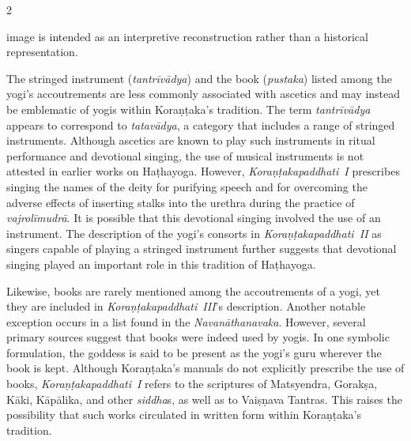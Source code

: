 \begin{nohyp}
\begin{multicols*}{2}
\begin{eng}
\noindent
image is intended as an interpretive reconstruction rather than a historical representation.

The stringed instrument (\emph{tantrīvādya}) and the book (\emph{pustaka}) listed among the yogi's accoutrements are less commonly associated with ascetics and may instead be emblematic of yogis within Koraṇṭaka's tradition. The term \emph{tantrīvādya} appears to correspond to \emph{tatavādya}, a category that includes a range of stringed instruments. Although ascetics are known to play such instruments in ritual performance and devotional singing, the use of musical instruments is not attested in earlier works on Haṭhayoga. However, \emph{Koraṇṭakapaddhati}~\emph{I} prescribes singing the names of the deity for purifying speech and for overcoming the adverse effects of inserting stalks into the urethra during the practice of \emph{vajrolīmudrā}. It is possible that this devotional singing involved the use of an instrument. The description of the yogi's consorts in \emph{Koraṇṭakapaddhati~II} as singers capable of playing a stringed instrument further suggests that devotional singing played an important role in this tradition of Haṭhayoga.

Likewise, books are rarely mentioned among the accoutrements of a yogi, yet they are included in \emph{Koraṇṭakapaddhati~III}'s description. Another notable exception occurs in a list found in the \emph{Navanāthanavaka}. However, several primary sources suggest that books were indeed used by yogis. In one symbolic formulation, the goddess is said to be present as the yogi's guru wherever the book is kept. Although Koraṇṭaka's manuals do not explicitly prescribe the use of books, \emph{Koraṇṭakapaddhati}~\emph{I} refers to the scriptures of Matsyendra, Gorakṣa, Kāki, Kāpālika, and other \emph{siddha}s, as well as to Vaiṣṇava Tantras. This raises the possibility that such works circulated in written form within Koraṇṭaka's tradition.


\end{eng}
\end{multicols*}
\end{nohyp}
